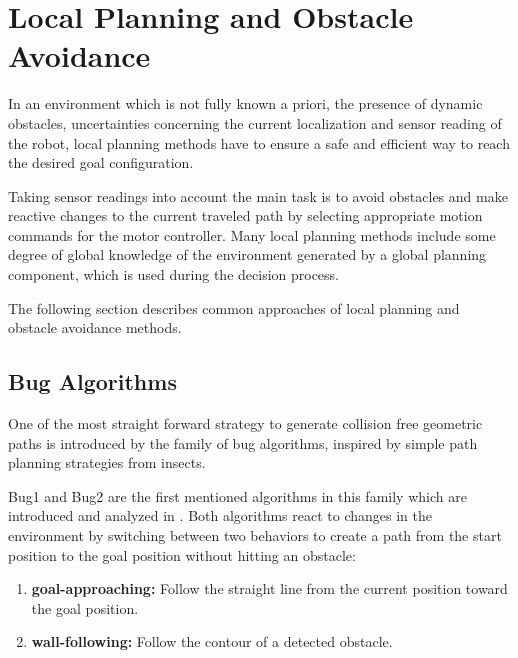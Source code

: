 \chapter{Local Planning and Obstacle Avoidance}\label{ch:local}
In an environment which is not fully known a priori, the presence of dynamic obstacles, uncertainties concerning the current localization and sensor reading of the robot, local planning methods have to ensure a safe and efficient way to reach the desired goal configuration.

Taking sensor readings into account the main task is to avoid obstacles and make reactive changes to the current traveled path by selecting appropriate motion commands for the motor controller.
Many local planning methods include some degree of global knowledge of the environment generated by a global planning component, which is used during the decision process.

The following section describes common approaches of local planning and obstacle avoidance methods. 

\section{Bug Algorithms}
One of the most straight forward strategy to generate collision free geometric paths is introduced by the family of bug algorithms, inspired by simple path planning strategies from insects.   

Bug1 and Bug2 are the first mentioned algorithms in this family which are introduced and analyzed in \cite{lumelsky1987path}.
Both algorithms react to changes in the environment by switching between two behaviors to create a path from the start position to the goal position without hitting an obstacle:
\begin{enumerate}
\item {\bf goal-approaching:} Follow the straight line from the current position toward the goal position.
\item {\bf wall-following:} Follow the contour of a detected obstacle.
\end{enumerate}

